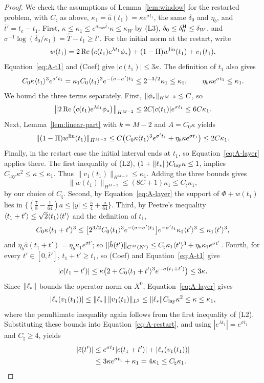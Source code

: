 \begin{proof}
We check the assumptions of Lemma~\ref{lem:window} for the restarted problem,
with $C_\natural$ as above, $\kappa_1=\hat a(t_1)=\kappa e^{\sigma t_1}$, the same
$\delta_0$ and $\eta_b$, and $\bar t'=t_e-t_1$. First,
$\kappa\le\kappa_1\le e^{\sigma_{\max}\bar t_1}\kappa\le\kappa_W$ by (L3),
$\delta_0\le\delta_0^{\mathrm{H}}\le\delta_W$, and $\sigma^{-1}\log(\delta_0/\kappa_1)=\hat T-t_1\ge\bar t'$.
For the initial norm at the restart, write
\[
w(t_1)=2\Re\big(c(t_1)e^{\lambda t_1}\phi_*\big)
 +(1-\Pi)w^{\mathrm{lin}}(t_1)+v_1(t_1).
\]
Equation~\eqref{eq:A-t1} and (Coef) give $|c(t_1)|\le3\kappa$.
The definition of $t_1$ also gives
\[
C_0\kappa\langle t_1\rangle^3e^{\sigma't_1}
=\kappa_1 C_0\langle t_1\rangle^3e^{-(\sigma-\sigma')t_1}
\le2^{-3/2}\kappa_1\le\kappa_1,
\qquad \eta_b\kappa e^{\sigma t_1}\le\kappa_1.
\]
We bound the three terms separately. First,
$\|\phi_*\|_{H^{M-2}}\le C$, so
\[
\big\|2\Re\big(c(t_1)e^{\lambda t_1}\phi_*\big)\big\|_{H^{M-2}}
\le2C|c(t_1)|e^{\sigma t_1}\le6C\kappa_1.
\]
Next, Lemma~\ref{lem:linear-part} with $k=M-2$ and $A=C_0\kappa$ yields
\[
\|(1-\Pi)w^{\mathrm{lin}}(t_1)\|_{H^{M-2}}
\le C\big(C_0\kappa\langle t_1\rangle^3e^{\sigma't_1}
 +\eta_b\kappa e^{\sigma t_1}\big)
\le2C\kappa_1.
\]
Finally, in the restart case the initial interval ends at $t_1$, so
Equation~\eqref{eq:A-layer} applies there. The first inequality of (L2),
$(1+\|\ell_*\|)C_{\mathrm{lay}}\kappa\le1$, implies
$C_{\mathrm{lay}}\kappa^2\le\kappa\le\kappa_1$. Thus
$\|v_1(t_1)\|_{H^{M-2}}\le\kappa_1$. Adding the three bounds gives
\[
\|w(t_1)\|_{H^{M-2}}
\le(8C+1)\kappa_1\le C_\natural\kappa_1,
\]
by our choice of $C_\natural$.
Second, by Equation~\eqref{eq:A-layer} the support of $\Phi+w(t_1)$ lies in
$\{(\frac78-\frac1{64})a\le|y|\le\frac54+\frac a{64}\}$. Third, by Peetre's inequality
$\langle t_1+t'\rangle\le\sqrt2\langle t_1\rangle\langle t'\rangle$ and the definition of $t_1$,
\[
C_0\kappa\langle t_1+t'\rangle^3\le\big[2^{3/2}C_0\langle t_1\rangle^3e^{-(\sigma-\sigma')t_1}\big]e^{-\sigma't_1}\kappa_1\langle t'\rangle^3\le\kappa_1\langle t'\rangle^3,
\]
and $\eta_b\hat a(t_1+t')=\eta_b\kappa_1e^{\sigma t'}$; so
$\|\tilde h(t')\|_{C^M(N')}\le C_\natural\kappa_1\langle t'\rangle^3+\eta_b\kappa_1e^{\sigma t'}$.
Fourth, for every $t'\in[0,\bar t']$, $t_1+t'\ge t_1$, so (Coef) and
Equation~\eqref{eq:A-t1} give
\[
|c(t_1+t')|\le\kappa\big(2+C_0\langle t_1+t'\rangle^3e^{-\sigma(t_1+t')}\big)
\le3\kappa.
\]
Since $\|\ell_*\|$ bounds the operator norm on $X^0$,
Equation~\eqref{eq:A-layer} gives
\[
|\ell_*(v_1(t_1))|
\le\|\ell_*\|\,\|v_1(t_1)\|_{L^2}
\le\|\ell_*\|C_{\mathrm{lay}}\kappa^2\le\kappa\le\kappa_1,
\]
where the penultimate inequality again follows from the first inequality
of (L2). Substituting these bounds into Equation~\eqref{eq:A-restart}, and
using $|e^{\lambda t_1}|=e^{\sigma t_1}$ and $C_\natural\ge4$, yields
\[
\begin{aligned}
|\tilde c(t')|
&\le e^{\sigma t_1}|c(t_1+t')|+|\ell_*(v_1(t_1))|\\
&\le3\kappa e^{\sigma t_1}+\kappa_1
=4\kappa_1\le C_\natural\kappa_1.
\end{aligned}
\]


\end{proof}
